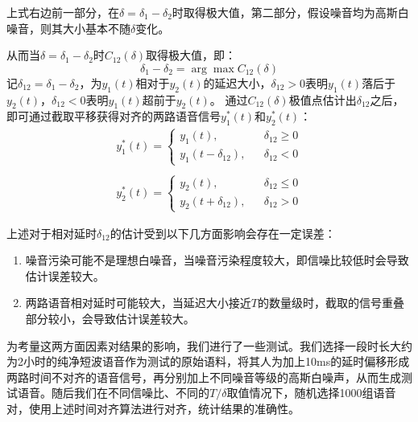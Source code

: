 上式右边前一部分，在$\delta=\delta_1-\delta_2$时取得极大值，第二部分，假设噪音均为高斯白噪音，则其大小基本不随$\delta$变化。

从而当$\delta=\delta_1-\delta_2$时$C_{12}(\delta)$取得极大值，即：
\begin{equation}
\delta_1 - \delta_2 = \arg \max C_{12}(\delta)
\end{equation}
记$\delta_{12}=\delta_1-\delta_2$，为$y_1 (t)$相对于$y_2 (t)$的延迟大小，$\delta_{12}>0$表明$y_1(t)$落后于$y_2(t)$，$\delta_{12}<0$表明$y_1(t)$超前于$y_2(t)$。
通过$C_{12}(\delta)$极值点估计出$\delta_{12}$之后，即可通过截取平移获得对齐的两路语音信号$y_1^*(t)$和$y_2^*(t)$：
\begin{equation}
    \begin{array}{l}
        y_1^*(t)=  \left\{ 
            \begin{array}{rcl}
            y_1(t), && {\delta_{12} \geq 0} \\
            y_1(t-\delta_{12}), && {\delta_{12} < 0}
            \end{array}
        \right. \\
        \\
        y_2^*(t)= \left\{ 
            \begin{array}{rcl}
            y_2(t), && {\delta_{12} \leq 0} \\
            y_2(t+\delta_{12}), && {\delta_{12} > 0}
            \end{array}
        \right.
    \end{array}
\end{equation}

上述对于相对延时$\delta_{12}$的估计受到以下几方面影响会存在一定误差：

\begin{enumerate}
\item 噪音污染可能不是理想白噪音，当噪音污染程度较大，即信噪比较低时会导致估计误差较大。
\item 两路语音相对延时可能较大，当延迟大小接近$T$的数量级时，截取的信号重叠部分较小，会导致估计误差较大。
\end{enumerate}

为考量这两方面因素对结果的影响，我们进行了一些测试。我们选择一段时长大约为2小时的纯净短波语音作为测试的原始语料，将其人为加上10ms的延时偏移形成两路时间不对齐的语音信号，再分别加上不同噪音等级的高斯白噪声，从而生成测试语音。随后我们在不同信噪比、不同的$T/\delta$取值情况下，随机选择1000组语音对，使用上述时间对齐算法进行对齐，统计结果的准确性。


